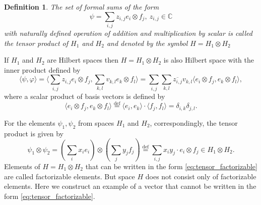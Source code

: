 \documentclass[%
master,         %
subf,           %
href,           %
colorlinks=true %
]{disser}
\numberwithin{equation}{section}
\numberwithin{figure}{section}
\newtheorem{definition}{Definition}[section]
\begin{document}
\begin{definition}
The set of formal sums of the form
\begin{equation}
\psi = \sum_{i,j}z_{i,j}e_i\otimes f_j,\ z_{i,j} \in \mathbb{C}
\label{eq:tensor_element}
\end{equation}
with naturally defined operation of addition and multiplication by scalar is called the tensor product of $H_1$ and $H_2$ and denoted by the symbol $H = H_1\otimes H_2$
\end{definition}

If $H_1$ and $H_2$ are Hilbert spaces then $H = H_1\otimes H_2$ is also Hilbert space with the inner product defined by
\[
\langle\psi, \varphi\rangle = \langle \sum_{i,j}z_{i,j}e_i\otimes f_j, \sum_{k,l}v_{k,l}e_k\otimes f_l \rangle = \sum_{i, j}\sum_{k, l}\overline{z_{i,j}}v_{k,l} \langle e_i\otimes f_j, e_k\otimes f_l \rangle,
\]
where a scalar product of basis vectors is defined by
\[
\langle e_i\otimes f_j, e_k\otimes f_l \rangle \overset{\mbox{def}}= \langle e_i, e_k\rangle \cdot \langle f_j, f_l \rangle = \delta_{i, k}\delta_{j, l}.
\]

For the elements $\psi_1, \psi_2$ from spaces $H_1$ and $H_2$, correspondingly, the tensor product is given by
\begin{equation}
\psi_1 \otimes \psi_2 = \left(\sum_ix_ie_i\right) \otimes \left(\sum_jy_jf_j\right) \overset{\mbox{def}}= \sum_{i, j} x_iy_j \cdot e_i \otimes f_j \in H_1 \otimes H_2.
\label{eq:tensor_factorizable}
\end{equation}
Elements of $H = H_1\otimes H_2$ that can be written in the form \eqref{eq:tensor_factorizable} are called factorizable elements. But space $H$ does not consist only of factorizable elements. Here we construct an example of a vector that cannot be written in the form  \eqref{eq:tensor_factorizable}.
\end{document}
